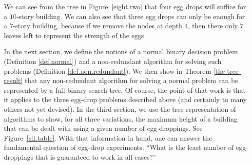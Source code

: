 \documentclass[12pt]{amsart}
\theoremstyle{definition}
\theoremstyle{theorem}
\begin{document}
We can see from  the tree  in Figure~\ref{eight.two} 
that four egg drops will suffice for a $10$-story building. We can also see that three egg drops
can only be enough for a $7$-story building, because if we remove the nodes at depth $4$, then there only
$7$ leaves left to represent the strength of the eggs.

In the next section, we define the notions of a normal binary decision problem (Definition \ref{def.normal})
and a non-redundant algorithm for solving such problems (Definition \ref{def.non.redundant}).  We then
show  in Theorem \ref{the-tree-result}  that any non-redundant algorithm for 
solving a normal problem can be represented by a full binary search tree.
Of course, the point of that work is that it applies to the three egg-drop problems 
described above (and certainly to  many others not yet devised).
In the third section, we use the tree representation of algorithms
to show, for all three variations,  the maximum height of a building that can be dealt with
using a given number of egg-droppings. See Figure~\ref{all.table}. With that information in hand, 
one can answer the fundamental question of egg-drop experiments:
``What is the least number of egg-droppings that is guaranteed to 
work in all cases?'' 

\end{document}
